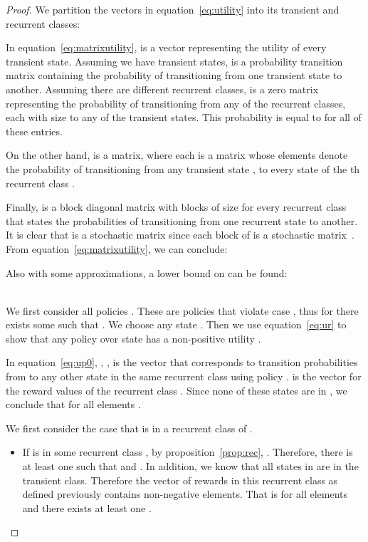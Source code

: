\begin{proof}
We partition the vectors in equation~\eqref{eq:utility} into its transient and recurrent classes:



In equation~\eqref{eq:matrixutility},  is a vector representing the utility of every transient state. Assuming we have  transient states,  is a  probability transition matrix containing the probability of transitioning from one transient state to another. 
Assuming there are  different recurrent classes,  is a zero matrix representing the probability of transitioning from any of the  recurrent classes, each with size  to any of the transient states. This probability is equal to  for all of these entries.


On the other hand,  is a  matrix, where each  is a  matrix whose elements denote the probability of transitioning from any transient state ,  to every state of the th recurrent class .


Finally,  is a block diagonal matrix with  blocks of size  for every recurrent class that states the probabilities of transitioning from one recurrent state to another. It is clear that  is a stochastic matrix since each block of  is a stochastic matrix~\cite{Durrett2012}.
From equation~\eqref{eq:matrixutility}, we can conclude:



Also with some approximations, a lower bound on  can be found:



\\
We first consider all policies . These are policies that violate case , thus for  there exists some  such that . We choose any state .
Then we use equation~\eqref{eq:ur} to show that any policy  over state  has a non-positive utility .

In equation~\eqref{eq:up0}, , ,  is the vector that corresponds to transition probabilities from  to any other state in the same recurrent class using policy .   is the vector for the reward values of the recurrent class . Since none of these states are in , we conclude that for all elements . 


We first consider the case that  is in a recurrent class of .
\begin{itemize}
\setlength{\leftmargin}{0pt}
\item If  is in some recurrent class , by proposition~\ref{prop:rec}, . Therefore, there is at least one  such that  and .
In addition, we know that all states in  are in the transient class. Therefore the vector of rewards in this recurrent class  as defined previously contains non-negative elements. That is for all elements  and there exists at least one .




\end{itemize}
\end{proof}
